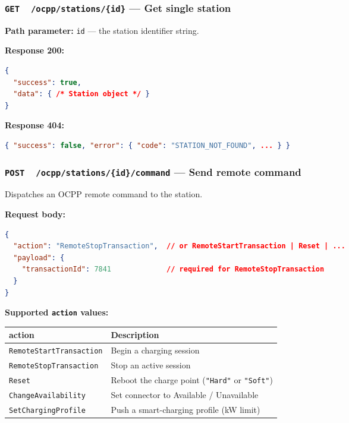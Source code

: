 \documentclass{article}
\newcommand{\GET}{\colorbox{evblue!20}{\texttt{\textbf{\color{evblue}GET}}}}
\newcommand{\POST}{\colorbox{emsgreen!20}{\texttt{\textbf{\color{emsgreen}POST}}}}
\begin{document}
\subsubsection{\GET\ \ \texttt{/ocpp/stations/\{id\}} --- Get single station}

\textbf{Path parameter:} \texttt{id} --- the station identifier string.

\textbf{Response 200:}
\begin{lstlisting}[language=json, caption=GET /ocpp/stations/{id} response]
{
  "success": true,
  "data": { /* Station object */ }
}
\end{lstlisting}

\textbf{Response 404:}
\begin{lstlisting}[language=json]
{ "success": false, "error": { "code": "STATION_NOT_FOUND", ... } }
\end{lstlisting}

\subsubsection{\POST\ \ \texttt{/ocpp/stations/\{id\}/command} --- Send remote command}

Dispatches an OCPP remote command to the station.

\textbf{Request body:}
\begin{lstlisting}[language=json, caption=Remote command request]
{
  "action": "RemoteStopTransaction",  // or RemoteStartTransaction | Reset | ...
  "payload": {
    "transactionId": 7841             // required for RemoteStopTransaction
  }
}
\end{lstlisting}

\textbf{Supported \texttt{action} values:}

\begin{center}
\begin{tabular}{ll}
\toprule
\textbf{action} & \textbf{Description}\\
\midrule
\texttt{RemoteStartTransaction} & Begin a charging session\\
\texttt{RemoteStopTransaction}  & Stop an active session\\
\texttt{Reset}                  & Reboot the charge point (\texttt{"Hard"} or \texttt{"Soft"})\\
\texttt{ChangeAvailability}     & Set connector to Available / Unavailable\\
\texttt{SetChargingProfile}     & Push a smart-charging profile (kW limit)\\
\bottomrule
\end{tabular}
\end{center}
\end{document}
